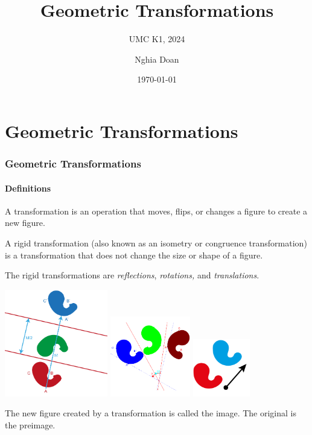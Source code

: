 \documentclass[8pt,xcolor=table,dvipsnames]{beamer}
\title{Geometric Transformations}
\subtitle{UMC K1, 2024}
\author{Nghia Doan}
\institute{MCC Club \& Competitions}
\date{\today}
\begin{document}
\section{Geometric Transformations}

\begin{frame}[t]
    \frametitle{Geometric Transformations}
    \framesubtitle{Definitions}
    A transformation is an operation that moves, flips, or changes a figure to create a new figure.

    \bigbreak
    A rigid transformation (also known as an isometry or congruence transformation)
    is a transformation that does not change the size or shape of a figure.
    
    \bigbreak
    The rigid transformations are \textit{reflections}, \textit{rotations,} and \textit{translations}.

    \begin{center}
        \includegraphics[width=4.5cm]{./svg/pdf/geo-reflection.pdf}
        \qquad
        \includegraphics[width=3.5cm]{./svg/pdf/geo-rotation.pdf}
        \qquad
        \includegraphics[width=2.5cm]{./svg/pdf/geo-translation.pdf}
    \end{center}

    The new figure created by a transformation is called the image. The original is the preimage.
\end{frame}
\end{document}
